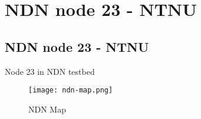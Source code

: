 \chapter{NDN node 23 - NTNU}

\section{NDN node 23 - NTNU}
Node 23 in NDN testbed

\begin{figure}[ht]
  \centering
  \texttt{[image: ndn-map.png]}
  \caption{NDN Map}
  \label{fig:ndn-map}
\end{figure}